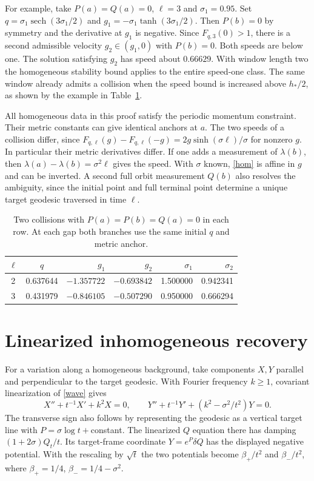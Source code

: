 \documentclass[11pt]{article}
\newcommand{\sech}{\operatorname{sech}}
\begin{document}
For example, take $P(a)=Q(a)=0$, $\ell=3$ and
$\sigma_1=0.95$. Set $q=\sigma_1\sech(3\sigma_1/2)$
and $g_1=-\sigma_1\tanh(3\sigma_1/2)$.
Then $P(b)=0$ by symmetry and the derivative at $g_1$ is negative.
Since $F_{q,3}(0)>1$, there is a second admissible velocity
$g_2\in(g_1,0)$ with $P(b)=0$.
Both speeds are below one. The solution satisfying $g_2$ has
speed about $0.66629$. With window length two the homogeneous
stability bound applies to the entire speed-one class.
The same window already admits a collision when the speed
bound is increased above $h_*/2$, as shown by the example in
Table~\ref{tab:collisions}.

All homogeneous data in this proof satisfy the periodic momentum
constraint. Their metric constants can give identical anchors at $a$.
The two speeds of a collision differ, since
$F_{q,\ell}(g)-F_{q,\ell}(-g)=2g\sinh(\sigma\ell)/\sigma$
for nonzero $g$. In particular their metric derivatives differ.
If one adds a measurement of $\lambda(b)$, then
$\lambda(a)-\lambda(b)=\sigma^2\ell$ gives the speed.
With $\sigma$ known, \eqref{hom} is affine in $g$ and can be inverted.
A second full orbit measurement $Q(b)$ also resolves the ambiguity,
since the initial point and full terminal point determine a unique
target geodesic traversed in time $\ell$.

\begin{table}[ht]
\centering
\begin{tabular}{ccrrrr}
\toprule
$\ell$ & $q$ & $g_1$ & $g_2$ & $\sigma_1$ & $\sigma_2$\\
\midrule
2 & 0.637644 & $-1.357722$ & $-0.693842$ & 1.500000 & 0.942341\\
3 & 0.431979 & $-0.846105$ & $-0.507290$ & 0.950000 & 0.666294\\
\bottomrule
\end{tabular}
\caption{Two collisions with $P(a)=P(b)=Q(a)=0$ in each row.
At each gap both branches use the same initial $q$ and metric anchor.}
\label{tab:collisions}
\end{table}







\section{Linearized inhomogeneous recovery}
For a variation along a homogeneous background, take components
$X,Y$ parallel and perpendicular to the target geodesic.
With Fourier frequency $k\ge1$, covariant linearization of
\eqref{wave} gives
\[
 X''+t^{-1}X'+k^2 X=0,\qquad
 Y''+t^{-1}Y'+(k^2-\sigma^2/t^2)Y=0.
\]
The transverse sign also follows by representing the geodesic
as a vertical target line with $P=\sigma\log t+$constant.
The linearized $Q$ equation there has damping $(1+2\sigma)Q_t/t$.
Its target-frame coordinate $Y=e^P\delta Q$ has the displayed
negative potential. With the rescaling by $\sqrt t$ the two
potentials become $\beta_+/t^2$ and $\beta_-/t^2$, where
$\beta_+=1/4$, $\beta_-=1/4-\sigma^2$.
\end{document}
